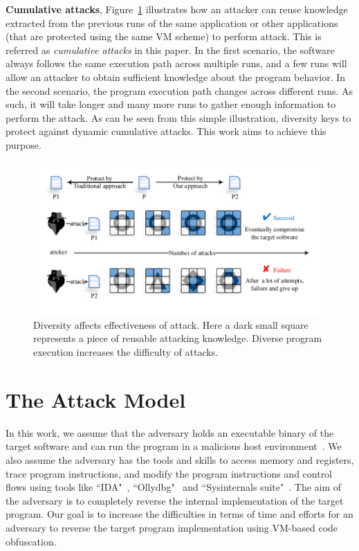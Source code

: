 \documentclass[conference]{IEEEtran}
\begin{document}
\textbf{Cumulative attacks}, Figure~\ref{fig:Fig.1} illustrates how an attacker
can reuse knowledge extracted from the previous runs of the same application or
other applications (that are protected using the same VM scheme) to perform attack.
This is referred as \emph{cumulative attacks} in this paper.
In the first scenario, the software always follows the same execution path
across multiple runs, and a few runs will allow an attacker to
obtain sufficient knowledge about the program behavior. In the second
scenario, the program execution path changes across different runs. As such,
it will take longer and many more runs to gather enough information to
perform the attack. As can be seen from this simple illustration, diversity keys to
protect against dynamic cumulative attacks. This work aims to achieve this purpose.

\begin{figure}[t]%
    \centering
    \includegraphics[width=1.0\columnwidth]{figure/figone.pdf}
    \caption{Diversity affects effectiveness of attack. Here a dark small square represents a piece of reusable attacking knowledge. Diverse program execution increases the difficulty of attacks.}\label{fig:Fig.1}
    \vspace{-5mm}
\end{figure}


\section{The Attack Model}
In this work, we assume that the adversary holds an executable binary of the
target software and can run the program in a malicious host
environment~\cite{11collberg2002watermarking}. We also assume the adversary
has the tools and skills to access memory and registers, trace program
instructions, and modify the program instructions and control flows using
tools like ``IDA"~\cite{14Idapro}, ``Ollydbg"~\cite{15Ollydbg} and
``Sysinternals suite"~\cite{16Sysinternalssuite}. The aim of the adversary is
to completely reverse the internal implementation of the target program.
Our goal is to increase the difficulties in terms of time and efforts for an adversary to
reverse the target program implementation using VM-based code obfuscation.
\end{document}
